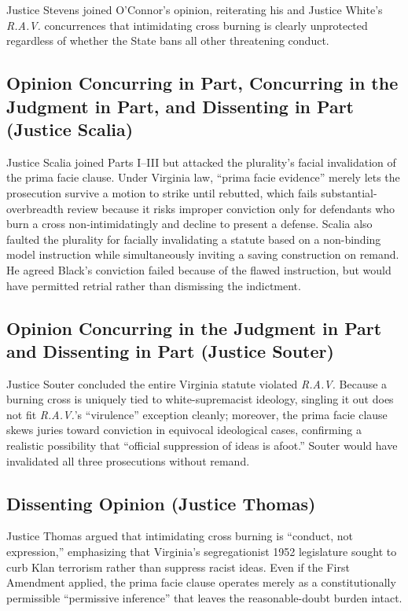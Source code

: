 \documentclass[12pt]{article}
\begin{document}
Justice Stevens joined O'Connor's opinion, reiterating his and Justice White's \textit{R.A.V.} concurrences that intimidating cross burning is clearly unprotected regardless of whether the State bans all other threatening conduct.

\subsection{Opinion Concurring in Part, Concurring in the Judgment in Part, and Dissenting in Part (Justice Scalia)}

Justice Scalia joined Parts I--III but attacked the plurality's facial invalidation of the prima facie clause. Under Virginia law, ``prima facie evidence'' merely lets the prosecution survive a motion to strike until rebutted, which fails substantial-overbreadth review because it risks improper conviction only for defendants who burn a cross non-intimidatingly and decline to present a defense. Scalia also faulted the plurality for facially invalidating a statute based on a non-binding model instruction while simultaneously inviting a saving construction on remand. He agreed Black's conviction failed because of the flawed instruction, but would have permitted retrial rather than dismissing the indictment.

\subsection{Opinion Concurring in the Judgment in Part and Dissenting in Part (Justice Souter)}

Justice Souter concluded the entire Virginia statute violated \textit{R.A.V.} Because a burning cross is uniquely tied to white-supremacist ideology, singling it out does not fit \textit{R.A.V.}'s ``virulence'' exception cleanly; moreover, the prima facie clause skews juries toward conviction in equivocal ideological cases, confirming a realistic possibility that ``official suppression of ideas is afoot.'' Souter would have invalidated all three prosecutions without remand.

\subsection{Dissenting Opinion (Justice Thomas)}

Justice Thomas argued that intimidating cross burning is ``conduct, not expression,'' emphasizing that Virginia's segregationist 1952 legislature sought to curb Klan terrorism rather than suppress racist ideas. Even if the First Amendment applied, the prima facie clause operates merely as a constitutionally permissible ``permissive inference'' that leaves the reasonable-doubt burden intact.
\end{document}
